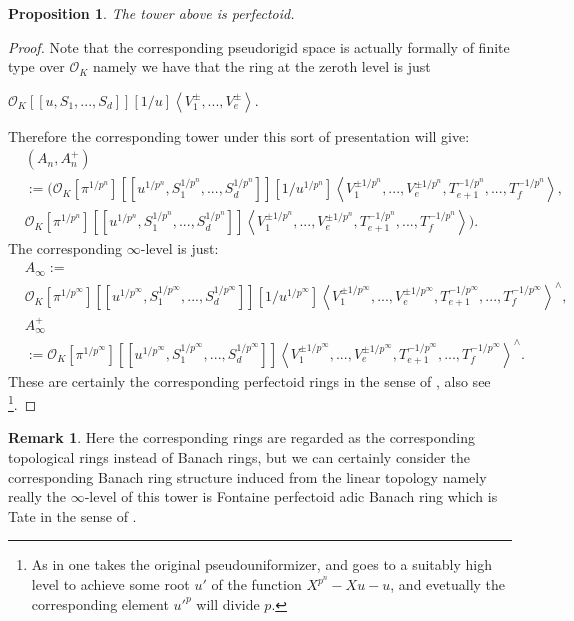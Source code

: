 \documentclass[11pt]{book}
\newtheorem{proposition}[theorem]{Proposition}
\theoremstyle{definition}
\newtheorem{remark}[theorem]{Remark}
\numberwithin{equation}{section}
\begin{document}
 
\begin{proposition}
The tower above is perfectoid.	
\end{proposition}

\begin{proof}
Note that the corresponding pseudorigid space is actually formally of finite type over $\mathcal{O}_K$ namely we have that the ring at the zeroth level is just
\begin{center}
 $\mathcal{O}_K[[u,S_1,...,S_d]][1/u]\left<V_1^{\pm},...,V_e^{\pm}\right>$. 
\end{center} 
Therefore the corresponding tower under this sort of presentation will give:
\begin{align}
&(A_n,A_n^+)\\
&:=(\mathcal{O}_K[\pi^{1/p^n}][[u^{1/p^n},S_1^{1/p^n},...,S_d^{1/p^n}]][1/u^{1/p^n}]\left<V_1^{\pm 1/p^n},...,V_e^{\pm 1/p^n},T^{-1/p^n}_{e+1},...,T^{-1/p^n}_f\right>,\\
&\mathcal{O}_K[\pi^{1/p^n}][[u^{1/p^n},S_1^{1/p^n},...,S_d^{1/p^n}]]\left<V_1^{\pm 1/p^n},...,V_e^{\pm 1/p^n},T^{-1/p^n}_{e+1},...,T^{-1/p^n}_f\right>).
\end{align}	
The corresponding $\infty$-level is just:
\begin{align}
&A_\infty:=\\
&\mathcal{O}_K[\pi^{1/p^\infty}][[u^{1/p^\infty},S_1^{1/p^\infty},...,S_d^{1/p^\infty}]][1/u^{1/p^\infty}]\left<V_1^{\pm 1/p^\infty},...,V_e^{\pm 1/p^\infty},T^{-1/p^\infty}_{e+1},...,T^{-1/p^\infty}_f\right>^\wedge,\\
&A_\infty^+\\
&:=\mathcal{O}_K[\pi^{1/p^\infty}][[u^{1/p^\infty},S_1^{1/p^\infty},...,S_d^{1/p^\infty}]]\left<V_1^{\pm 1/p^\infty},...,V_e^{\pm 1/p^\infty},T^{-1/p^\infty}_{e+1},...,T^{-1/p^\infty}_f\right>^\wedge.
\end{align}
These are certainly the corresponding perfectoid rings in the sense of \cite[Definition 3.3.1]{12KL2}, also see \cite[Lemma 3.3.28]{12KL2}\footnote{As in \cite[Lemma 3.3.28]{12KL2} one takes the original pseudouniformizer, and goes to a suitably high level to achieve some root $u'$ of the function $X^{p^n}-Xu-u$, and evetually the corresponding element $u'^p$ will divide $p$.}.  
\end{proof}


\begin{remark}
Here the corresponding rings are regarded as the corresponding topological rings instead of Banach rings, but we can certainly consider the corresponding Banach ring structure induced from the linear topology namely really the $\infty$-level of this tower is Fontaine perfectoid adic Banach ring which is Tate in the sense of \cite[Definition 3.1.1]{12KL2}.	
\end{remark}
\end{document}
